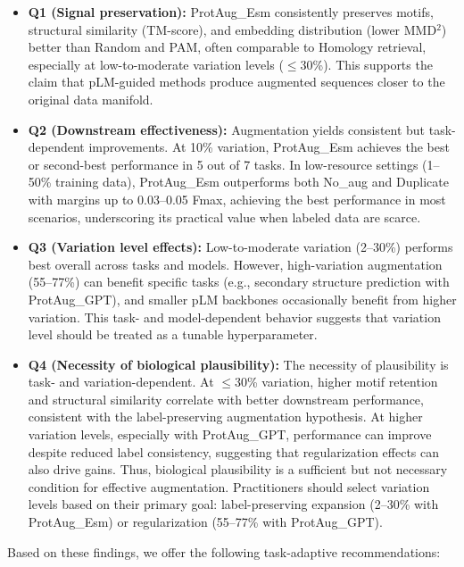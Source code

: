 \documentclass{article}
\begin{document}
\begin{itemize}
    \item \textbf{Q1 (Signal preservation):} ProtAug\_Esm consistently preserves motifs, structural similarity (TM-score), and embedding distribution (lower MMD\(^2\)) better than Random and PAM, often comparable to Homology retrieval, especially at low-to-moderate variation levels ($\leq$30\%). This supports the claim that pLM-guided methods produce augmented sequences closer to the original data manifold.

    \item \textbf{Q2 (Downstream effectiveness):} Augmentation yields consistent but task-dependent improvements. At 10\% variation, ProtAug\_Esm achieves the best or second-best performance in 5 out of 7 tasks. In low-resource settings (1–50\% training data), ProtAug\_Esm outperforms both No\_aug and Duplicate with margins up to 0.03–0.05 Fmax, achieving the best performance in most scenarios, underscoring its practical value when labeled data are scarce.

    \item \textbf{Q3 (Variation level effects):} Low-to-moderate variation (2–30\%) performs best overall across tasks and models. However, high-variation augmentation (55–77\%) can benefit specific tasks (e.g., secondary structure prediction with ProtAug\_GPT), and smaller pLM backbones occasionally benefit from higher variation. This task- and model-dependent behavior suggests that variation level should be treated as a tunable hyperparameter.

    \item \textbf{Q4 (Necessity of biological plausibility):} The necessity of plausibility is task- and variation-dependent. At $\leq$30\% variation, higher motif retention and structural similarity correlate with better downstream performance, consistent with the label-preserving augmentation hypothesis. At higher variation levels, especially with ProtAug\_GPT, performance can improve despite reduced label consistency, suggesting that regularization effects can also drive gains. Thus, biological plausibility is a sufficient but not necessary condition for effective augmentation. Practitioners should select variation levels based on their primary goal: label-preserving expansion (2–30\% with ProtAug\_Esm) or regularization (55–77\% with ProtAug\_GPT).
\end{itemize}

Based on these findings, we offer the following task-adaptive recommendations:
\end{document}
